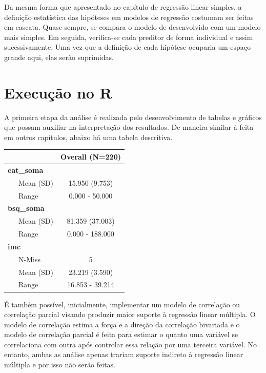 \documentclass[
]{book}
\newenvironment{Shaded}{\begin{snugshade}}{\end{snugshade}}
\newcommand{\KeywordTok}[1]{\textcolor[rgb]{0.13,0.29,0.53}{\textbf{#1}}}
\newcommand{\NormalTok}[1]{#1}
\newcommand{\OperatorTok}[1]{\textcolor[rgb]{0.81,0.36,0.00}{\textbf{#1}}}
\newcommand{\StringTok}[1]{\textcolor[rgb]{0.31,0.60,0.02}{#1}}
\begin{document}
Da mesma forma que apresentado no capítulo de regressão linear simples, a definição estatística das hipóteses em modelos de regressão costumam ser feitas em cascata. Quase sempre, se compara o modelo de desenvolvido com um modelo mais simples. Em seguida, verifica-se cada preditor de forma individual e assim sucessivamente. Uma vez que a definição de cada hipótese ocuparia um espaço grande aqui, elas serão suprimidas.

\hypertarget{execuuxe7uxe3o-no-r-14}{%
\section{Execução no R}\label{execuuxe7uxe3o-no-r-14}}

A primeira etapa da análise é realizada pelo desenvolvimento de tabelas e gráficos que possam auxiliar na interpretação dos resultados. De maneira similar à feita em outros capítulos, abaixo há uma tabela descritiva.

\begin{Shaded}
\end{Shaded}

\begin{longtable}[]{@{}lc@{}}
\toprule
& Overall (N=220)\tabularnewline
\midrule
\endhead
\textbf{eat\_soma} &\tabularnewline
~~~Mean (SD) & 15.950 (9.753)\tabularnewline
~~~Range & 0.000 - 50.000\tabularnewline
\textbf{bsq\_soma} &\tabularnewline
~~~Mean (SD) & 81.359 (37.003)\tabularnewline
~~~Range & 0.000 - 188.000\tabularnewline
\textbf{imc} &\tabularnewline
~~~N-Miss & 5\tabularnewline
~~~Mean (SD) & 23.219 (3.590)\tabularnewline
~~~Range & 16.853 - 39.214\tabularnewline
\bottomrule
\end{longtable}

É também possível, inicialmente, implementar um modelo de correlação ou correlação parcial visando produzir maior suporte à regressão linear múltipla. O modelo de correlação estima a força e a direção da correlação bivariada e o modelo de correlação parcial é feita para estimar o quanto uma variável se correlaciona com outra após controlar essa relação por uma terceira variável. No entanto, ambas as análise apenas trariam suporte indireto à regressão linear múltipla e por isso não serão feitas.
\end{document}
